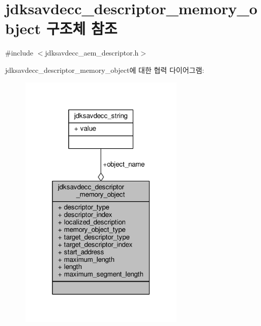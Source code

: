 \hypertarget{structjdksavdecc__descriptor__memory__object}{}\section{jdksavdecc\+\_\+descriptor\+\_\+memory\+\_\+object 구조체 참조}
\label{structjdksavdecc__descriptor__memory__object}


{\ttfamily \#include $<$jdksavdecc\+\_\+aem\+\_\+descriptor.\+h$>$}



jdksavdecc\+\_\+descriptor\+\_\+memory\+\_\+object에 대한 협력 다이어그램\+:
\nopagebreak
\begin{figure}[H]
\begin{center}
\leavevmode
\includegraphics[width=223pt]{structjdksavdecc__descriptor__memory__object__coll__graph}
\end{center}
\end{figure}
